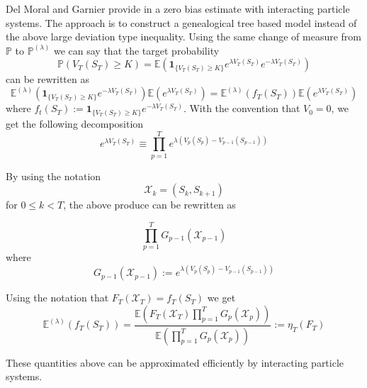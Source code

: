 Del Moral and Garnier provide in \cite{delmoral2005} a zero bias estimate with interacting particle systems. The approach is to construct a genealogical tree based model instead of the above large deviation type inequality.
Using the same change of measure from $\mathbb{P}$ to $\mathbb{P}^{(\lambda)}$ we can say that the target probability
$$\mathbb{P}(V_T(S_T) \geq K) = \mathbb{E}\left( \mathbf{1}_{\{V_T(S_T) \geq K\}}e^{\lambda V_T(S_T)}e^{-\lambda V_T(S_T)} \right)$$
can be rewritten as
$$\mathbb{E}^{(\lambda)} \left(  \mathbf{1}_{\{V_T(S_T) \geq K\}} e^{-\lambda V_T(S_T)} \right) \mathbb{E} \left(e^{\lambda V_T(S_T)}\right) = 
\mathbb{E}^{(\lambda)}(f_T(S_T)) \mathbb{E}(e^{\lambda V_T(S_T)})  $$
where $f_t(S_T) := \mathbf{1}_{\{V_T(S_T) \geq K\}}e^{-\lambda V_T(S_T)} $. With the convention that $V_0 = 0$, we get the following decomposition
$$e^{\lambda V_T(S_T)} \equiv \prod_{p=1}^{T} e^{\lambda (V_p(S_p) - V_{p-1}(S_{p-1}))}$$

By using the notation $$\mathcal{X}_k = (S_k, S_{k+1})$$ for $0 \leq k < T$, the above produce can be rewritten as

$$\prod_{p=1}^{T} G_{p-1}(\mathcal{X}_{p-1})$$ where
$$G_{p-1}(\mathcal{X}_{p-1}) := e^{\lambda (V_p(S_p) - V_{p-1}(S_{p-1}))}$$

Using the notation that $F_T(\mathcal{X}_T) = f_T(S_T)$ we get
\begin{equation}
	\mathbb{E}^{(\lambda)}(f_T(S_T)) = \frac{\mathbb{E}(F_T(\mathcal{X}_T)\prod_{p=1}^{T}G_p(\mathcal{X}_p))}{\mathbb{E}(\prod_{p=1}^{T}G_p(\mathcal{X}_p))} := \eta_T(F_T)
\end{equation}

These quantities above can be approximated efficiently by interacting particle systems.

